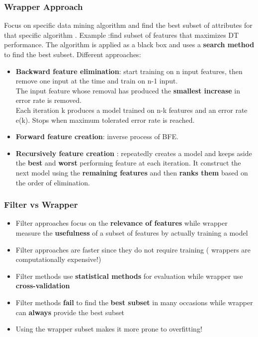 \subsubsection{Wrapper Approach}
Focus on specific data mining algorithm and find the best subset of attributes for that specific algorithm . Example :find subset of features that maximizes DT performance. The algorithm is applied as a black box and uses a \textbf{search method} to find the best subset.
Different approaches:
\begin{itemize}
\item \textbf{Backward feature elimination}: start training on n input features, then remove one input at the time and train on n-1 input.\\
The input feature whose removal has produced the \textbf{smallest increase} in error rate is removed.\\
Each iteration k produces a model trained on n-k features and an error rate e(k). Stops when maximum tolerated error rate is reached.

\item \textbf{Forward feature creation}: inverse process of BFE.

\item \textbf{Recursively feature creation} : repeatedly creates a model and keeps aside the \textbf{best} and \textbf{worst} performing feature at each iteration. It construct the next model using the \textbf{remaining features} and then \textbf{ranks them} based on the order of elimination.
\end{itemize}


\subsubsection{Filter vs Wrapper}
\begin{itemize}
\item Filter approaches focus on the \textbf{relevance of features} while wrapper measure the \textbf{usefulness} of a subset of features by actually training a model
\item Filter approaches are faster since they do not require training ( wrappers are computationally expensive!)
\item Filter methods use \textbf{statistical methods} for evaluation while wrapper use \textbf{cross-validation}
\item Filter methods \textbf{fail} to find the \textbf{best subset} in many occasions while wrapper can \textbf{always} provide the best subset
\item Using the wrapper subset makes it more prone to overfitting!
\end{itemize}
